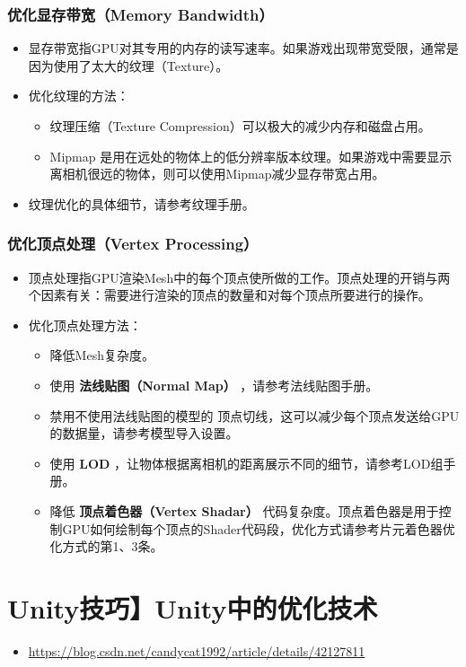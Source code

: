 \documentclass[9pt, b5paper]{article}
\begin{document}
\subsubsection{优化显存带宽（Memory Bandwidth）}
\label{sec-6-4-2}
\begin{itemize}
\item 显存带宽指GPU对其专用的内存的读写速率。如果游戏出现带宽受限，通常是因为使用了太大的纹理（Texture）。
\item 优化纹理的方法：
\begin{itemize}
\item 纹理压缩（Texture Compression）可以极大的减少内存和磁盘占用。
\item Mipmap 是用在远处的物体上的低分辨率版本纹理。如果游戏中需要显示离相机很远的物体，则可以使用Mipmap减少显存带宽占用。
\end{itemize}
\item 纹理优化的具体细节，请参考纹理手册。
\end{itemize}
\subsubsection{优化顶点处理（Vertex Processing）}
\label{sec-6-4-3}
\begin{itemize}
\item 顶点处理指GPU渲染Mesh中的每个顶点使所做的工作。顶点处理的开销与两个因素有关：需要进行渲染的顶点的数量和对每个顶点所要进行的操作。
\item 优化顶点处理方法：
\begin{itemize}
\item 降低Mesh复杂度。
\item 使用 \textbf{法线贴图（Normal Map）} ，请参考法线贴图手册。
\item 禁用不使用法线贴图的模型的 顶点切线，这可以减少每个顶点发送给GPU的数据量，请参考模型导入设置。
\item 使用 \textbf{LOD} ，让物体根据离相机的距离展示不同的细节，请参考LOD组手册。
\item 降低 \textbf{顶点着色器（Vertex Shadar）} 代码复杂度。顶点着色器是用于控制GPU如何绘制每个顶点的Shader代码段，优化方式请参考片元着色器优化方式的第1、3条。
\end{itemize}
\end{itemize}

\section{Unity技巧】Unity中的优化技术}
\label{sec-7}
\begin{itemize}
\item \url{https://blog.csdn.net/candycat1992/article/details/42127811}
\end{itemize}
\end{document}
